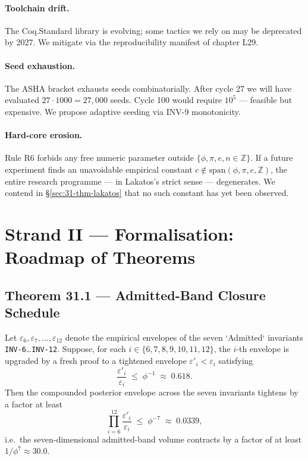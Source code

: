\paragraph{Toolchain drift.} The Coq.Standard library is evolving; some tactics we rely on may be deprecated by 2027. We mitigate via the reproducibility manifest of chapter L29.

\paragraph{Seed exhaustion.} The ASHA bracket exhausts seeds combinatorially. After cycle 27 we will have evaluated $27 \cdot 1000 = 27{,}000$ seeds. Cycle 100 would require $10^{5}$ — feasible but expensive. We propose adaptive seeding via INV-9 monotonicity.

\paragraph{Hard-core erosion.} Rule R6 forbids any free numeric parameter outside $\{\phi, \pi, e, n \in \mathbb{Z}\}$. If a future experiment finds an unavoidable empirical constant $c \notin \mathrm{span}(\phi, \pi, e, \mathbb{Z})$, the entire research programme — in Lakatos's strict sense — degenerates. We contend in §\ref{sec:31-thm-lakatos} that no such constant has yet been observed.

\section{Strand II — Formalisation: Roadmap of Theorems}
\label{sec:31-strand-2}

\subsection{Theorem 31.1 — Admitted-Band Closure Schedule}
\label{sec:31-thm-closure}

\begin{theorem}
\label{thm:31-1-closure}
Let $\varepsilon_{6}, \varepsilon_{7}, \dots, \varepsilon_{12}$ denote the empirical envelopes of the seven `Admitted` invariants \texttt{INV-6}…\texttt{INV-12}. Suppose, for each $i \in \{6,7,8,9,10,11,12\}$, the $i$-th envelope is upgraded by a fresh proof to a tightened envelope $\varepsilon'_{i} < \varepsilon_{i}$ satisfying
\[
\frac{\varepsilon'_{i}}{\varepsilon_{i}} \;\leq\; \phi^{-1} \;\approx\; 0.618.
\]
Then the compounded posterior envelope across the seven invariants tightens by a factor at least
\[
\prod_{i=6}^{12} \frac{\varepsilon'_{i}}{\varepsilon_{i}} \;\leq\; \phi^{-7} \;\approx\; 0.0339,
\]
i.e.\ the seven-dimensional admitted-band volume contracts by a factor of at least $1/\phi^{7} \approx 30.0$.
\end{theorem}

